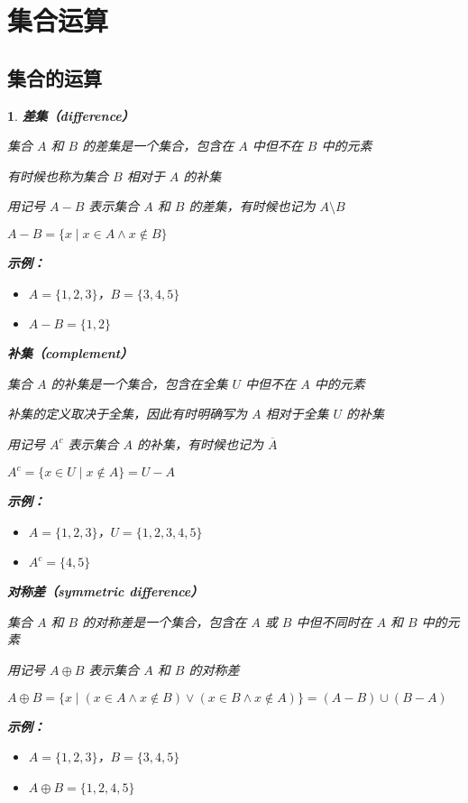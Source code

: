 \documentclass[UTF8]{report}
\theoremstyle{MyLineTheoremStyle} %
\theoremstyle{MyBlockTheoremStyle} %
\theoremstyle{MySubsubsectionStyle} %
\newtheorem{definition}{}
\begin{document}
\section{集合运算}

\subsection{集合的运算}

\begin{definition}
    \textbf{差集（difference）}\par
    集合 $A$ 和 $B$ 的差集是一个集合，包含在 $A$ 中但不在 $B$ 中的元素\par
    有时候也称为集合 $B$ 相对于 $A$ 的补集\par
    用记号 $A - B$ 表示集合 $A$ 和 $B$ 的差集，有时候也记为 $A \setminus B$\par
    $A - B = \{x \mid x \in A \land x \notin B\}$\par

    \textbf{示例：}\par
    \begin{itemize}
        \item $A = \{1, 2, 3\}$，$B = \{3, 4, 5\}$
        \item $A - B = \{1, 2\}$
    \end{itemize}

    \textbf{补集（complement）}\par
    集合 $A$ 的补集是一个集合，包含在全集 $U$ 中但不在 $A$ 中的元素\par
    补集的定义取决于全集，因此有时明确写为 $A$ 相对于全集 $U$ 的补集\par
    用记号 $A^c$ 表示集合 $A$ 的补集，有时候也记为 $\overline{A}$\par
    $A^c = \{x \in U \mid x \notin A\} = U - A$\par

    \textbf{示例：}\par
    \begin{itemize}
        \item $A = \{1, 2, 3\}$，$U = \{1, 2, 3, 4, 5\}$
        \item $A^c = \{4, 5\}$
    \end{itemize}

    \textbf{对称差（symmetric difference）}\par
    集合 $A$ 和 $B$ 的对称差是一个集合，包含在 $A$ 或 $B$ 中但不同时在 $A$ 和 $B$ 中的元素\par
    用记号 $A \oplus B$ 表示集合 $A$ 和 $B$ 的对称差\par
    $A \oplus B = \{x \mid (x \in A \land x \notin B) \lor (x \in B \land x \notin A)\} = (A - B) \cup (B - A)$\par

    \textbf{示例：}\par
    \begin{itemize}
        \item $A = \{1, 2, 3\}$，$B = \{3, 4, 5\}$
        \item $A \oplus B = \{1, 2, 4, 5\}$
    \end{itemize}
\end{definition}
\end{document}
